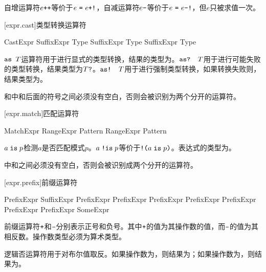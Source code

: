 \pnum
自增运算符$e\texttt{++}$等价于$e\ \texttt{=}\ e\texttt{+!}$，自减运算符$e\texttt{--}$等价于$e\ \tcode{=}\ e\tcode{-!}$，但$e$只被求值一次。

[expr.cast]{类型转换运算符}

\begin{bnf}{CastExpr}
    SuffixExpr  Type \br
    SuffixExpr  Type \br
    SuffixExpr  Type
\end{bnf}

\pnum
$\texttt{as }T$运算符用于进行显式的类型转换，结果的类型为。$\texttt{as? }T$用于进行可能失败的类型转换，结果类型为$T\texttt{?}$。$\texttt{as! }T$用于进行强制类型转换，如果转换失败则，结果类型为。

\pnum
\enternote {}和中和后面的符号之间必须没有空白，否则会被识别为两个分开的运算符。\exitnote

[expr.match]{匹配运算符}

\begin{bnf}{MatchExpr}
    RangeExpr  Pattern \br
    RangeExpr  Pattern
\end{bnf}

\pnum
$a \mathrel{\texttt{is}} p$检测$a$是否匹配模式$p$。$a \mathrel{\texttt{!is}} p$等价于$\texttt{!(}a \mathrel{\texttt{is}} p\texttt{)}$。表达式的类型为。

\pnum
\enternote {}中\tcode{!}和之间必须没有空白，否则会被识别成两个分开的运算符。\exitnote

[expr.prefix]{前缀运算符}

\begin{bnf}{PrefixExpr}
    SuffixExpr \br
    \terminal{+} PrefixExpr \br
    \terminal{-} PrefixExpr \br
    \terminal{!} PrefixExpr \br
     PrefixExpr \br
    \terminal{\&} PrefixExpr \br
    \terminal{\&}  PrefixExpr \br
    \terminal{*} PrefixExpr \br
    SomeExpr
\end{bnf}

\pnum
前缀运算符$\mathbin{\texttt{+}}$和$\mathbin{\texttt{-}}$分别表示正号和负号。其中$\mathbin{\texttt{+}}$的值为其操作数的值，而$\mathbin{\texttt{-}}$的值为其相反数。操作数类型必须为算术类型。

\pnum
逻辑否运算符\tcode{!}用于对布尔值取反。如果操作数为，则结果为；如果操作数为，则结果为。

